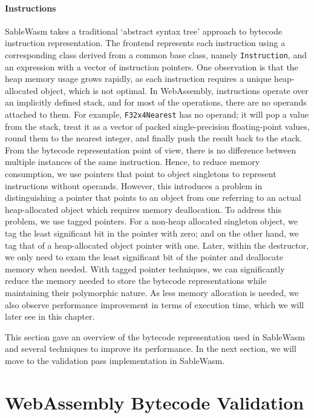 \paragraph{Instructions}
SableWasm takes a traditional `abstract syntax tree' approach to bytecode
instruction representation. The frontend represents each instruction using a
corresponding class derived from a common base class, namely
\texttt{Instruction}, and an expression with a vector of instruction pointers.
One observation is that the heap memory usage grows rapidly, as each instruction
requires a unique heap-allocated object, which is not optimal. In WebAssembly,
instructions operate over an implicitly defined stack, and for most of the
operations, there are no operands attached to them. For example,
\texttt{F32x4Nearest} has no operand; it will pop a value from the stack, treat
it as a vector of packed single-precision floating-point values, round them to
the nearest integer, and finally push the result back to the stack. From the
bytecode representation point of view, there is no difference between multiple
instances of the same instruction. Hence, to reduce memory consumption, we use
pointers that point to object singletons to represent instructions without
operands. However, this introduces a problem in distinguishing a pointer that
points to an object from one referring to an actual heap-allocated object which
requires memory deallocation. To address this problem, we use tagged pointers.
For a non-heap allocated singleton object, we tag the least significant bit in
the pointer with zero; and on the other hand, we tag that of a heap-allocated
object pointer with one. Later, within the destructor, we only need to exam the
least significant bit of the pointer and deallocate memory when needed. With
tagged pointer techniques, we can significantly reduce the memory needed to
store the bytecode representations while maintaining their polymorphic nature.
As less memory allocation is needed, we also observe performance improvement in
terms of execution time, which we will later see in this chapter.

This section gave an overview of the bytecode representation used in SableWasm
and several techniques to improve its performance. In the next section, we will
move to the validation pass implementation in SableWasm.

\section{WebAssembly Bytecode Validation}

